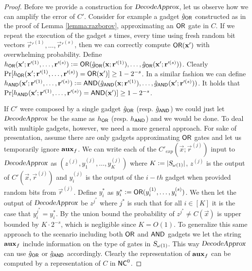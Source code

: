 \begin{proof}
Before we provide a construction for ${\textsl{DecodeApprox}}$, let us observe how we can amplify the error of $C'$.  Consider for example a gadget $\hat{g}_{\mathsf{OR}}$ constructed as in the proof of Lemma \ref{lemma:razborov}, approximating  an $\mathsf{OR}$ gate in $C$.
If we repeat the execution of the gadget $s$ times, every time using fresh random bit vectors $\vec{r}'^{(1)},\dots, \vec{r}'^{(s)}$, then we can correctly compute $\mathsf{OR}(\mathbf{x}')$ with overwhelming probability. Define $h_{\mathsf{OR}}(\mathbf{x}'; \mathbf{r}'^{(1)},\dots, \mathbf{r}'^{(s)}) \vcentcolon= \mathsf{OR}(\hat{g}_{\mathsf{OR}}(\mathbf{x}; \mathbf{r}'^{(1)}), \dots, \hat{g}_{\mathsf{OR}}(\mathbf{x}'; \mathbf{r}'^{(s)}))$. Clearly $\Pr[h_{\mathsf{OR}}(\mathbf{x}'; \mathbf{r}'^{(1)},\dots, \mathbf{r}'^{(s)}) = \mathsf{OR}(\mathbf{x}')] \geq 1 - 2^{-s}$.
In a similar fashion we can define  $h_{\mathsf{AND}}(\mathbf{x}'; \mathbf{r}'^{(1)},\dots, \mathbf{r}'^{(s)}) \vcentcolon= \mathsf{AND}(\hat{g}_{\mathsf{AND}}(\mathbf{x}; \mathbf{r}'^{(1)}), \dots, \hat{g}_{\mathsf{AND}}(\mathbf{x}'; \mathbf{r}'^{(s)}))$. It holds that $\Pr[h_{\mathsf{AND}}(\mathbf{x}'; \mathbf{r}'^{(1)},\dots, \mathbf{r}'^{(s)}) = \mathsf{AND}(\mathbf{x}')] \geq 1 - 2^{-s}$.

If $C'$ were composed by a single gadget $\hat{g}_{\mathsf{OR}}$ (resp. $\hat{g}_{\mathsf{AND}}$) we could just let ${\textsl{DecodeApprox}}$ be the same as $h_{\mathsf{OR}}$ (resp. $h_{\mathsf{AND}}$) and we would be done. To deal with multiple gadgets, however, we need a more general approach. For sake of presentation, assume there are only gadgets approximating $\mathsf{OR}$ gates and let us temporarily ignore $\mathbf{aux}_f$. We can write each of the $C'_{exp}(\vec{x}; \vec{r}^{(j)})$ input to ${\textsl{DecodeApprox}}$ as $(z^{(j)}, y_1^{(j)}, \dots, y_K^{(j)})$ where $K \vcentcolon= |{\textsl{S}}_{\omega(1)}|$, $z^{(j)}$ is the output of $C'(\vec{x}, \vec{r}^{(j)})$ and $y_i^{(j)}$ is the output of the $i-th$ gadget when provided random bits from $\vec{r}^{(j)}$. Define $y_i^*$ as $y_i^* \vcentcolon= \mathsf{OR}(y_i^{(1)}, \dots,y_i^{(s)})$. 
We then let the output of ${\textsl{DecodeApprox}}$ be $z^{j^*}$ where $j^*$ is such that for all $i \in [K]$ it is the case that $y_i^{j^*} = y_i^*$. By the union bound the probability of $z^{j^*} \not = C(\vec{x})$ is upper bounded by $K\cdot 2^{-s}$, which is negligible since $K = O(1)$. 
To generalize this same approach to the scenario including both $\mathsf{OR}$ and $\mathsf{AND}$ gadgets we let the string $\mathbf{aux}_f$ include information on the type of gates in ${\textsl{S}}_{\omega(1)}$. This way  ${\textsl{DecodeApprox}}$ can use $\hat{g}_{\mathsf{OR}}$ or $\hat{g}_{\mathsf{AND}}$ accordingly.
Clearly the  representation of $\mathbf{aux}_f$ can be computed by a representation of $C$ in ${\mathsf{NC}}^0$.
\end{proof}


